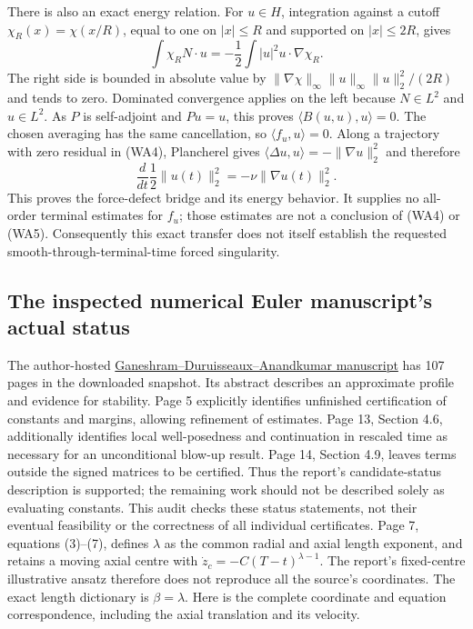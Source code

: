 There is also an exact energy relation. For $u\in H$, integration against a
cutoff $\chi_R(x)=\chi(x/R)$, equal to one on $|x|\leq R$ and supported on
$|x|\leq2R$, gives
\[
 \int\chi_R N\cdot u
 =-\frac12\int |u|^2u\cdot\nabla\chi_R.
\]
The right side is bounded in absolute value by
$\|\nabla\chi\|_\infty\|u\|_\infty\|u\|_2^2/(2R)$ and tends to zero.
Dominated convergence applies on the left because $N\in L^2$ and $u\in L^2$.
As $P$ is self-adjoint and $Pu=u$, this proves
$\langle B(u,u),u\rangle=0$. The chosen averaging has the same cancellation,
so $\langle f_u,u\rangle=0$. Along a trajectory with zero residual in (WA4),
Plancherel gives $\langle\Delta u,u\rangle=-\|\nabla u\|_2^2$ and therefore
\[
 \frac{d}{dt}\frac12\|u(t)\|_2^2=-\nu\|\nabla u(t)\|_2^2. \tag{WA5}
\]
This proves the force-defect bridge and its energy behavior. It supplies no
all-order terminal estimates for $f_u$; those estimates are not a conclusion
of (WA4) or (WA5). Consequently this exact transfer does not itself establish
the requested smooth-through-terminal-time forced singularity.

\subsection{The inspected numerical Euler manuscript's actual status}
The author-hosted
\href{https://anima-ai.org/wp-content/uploads/2026/09/Euler.pdf}{Ganeshram--Duruisseaux--Anandkumar manuscript}
has 107 pages in the downloaded snapshot. Its abstract describes an
approximate profile and evidence for stability. Page 5 explicitly identifies
unfinished certification of constants and margins, allowing refinement of
estimates. Page 13, Section 4.6, additionally identifies local well-posedness
and continuation in rescaled time as necessary for an unconditional blow-up
result. Page 14, Section 4.9, leaves terms outside the signed matrices to be
certified. Thus the report's candidate-status description is supported;
the remaining work should not be described solely as evaluating constants.
This audit checks these status statements, not their eventual feasibility or
the correctness of all individual certificates.
Page 7, equations (3)--(7), defines $\lambda$ as the common radial and axial
length exponent, and retains a moving axial centre with
$\dot z_c=-C(T-t)^{\lambda-1}$.
The report's fixed-centre illustrative ansatz therefore does not reproduce
all the source's coordinates. The exact length dictionary is
$\beta=\lambda$. Here is the complete coordinate and equation correspondence,
including the axial translation and its velocity.


